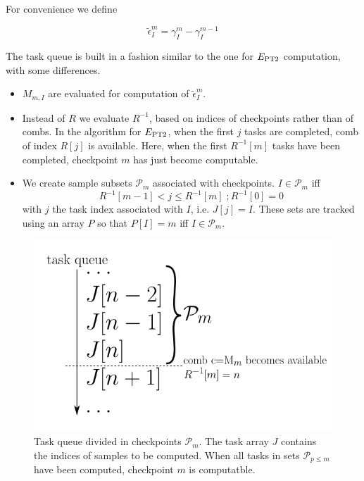 \documentclass[./thesis.tex]{subfiles}
\begin{document}
For convenience we define

\begin{equation}
\tilde \epsilon^m_I = \gamma^m_I - \gamma^{m-1}_I
\end{equation}


The task queue is built in a fashion similar to the one for $E_\text{PT2}$ computation, with some differences.
\begin{itemize}
\item
$M_{m,I}$ are evaluated for computation of $\tilde \epsilon^m_I$.
\item
Instead of $R$ we evaluate $R^{-1}$, based on indices of checkpoints rather than of combs. In the algorithm for $E_\text{PT2}$, when the first $j$ tasks are completed, comb of index $R[j]$ is available. Here, when the first $R^{-1}[m]$ tasks have been completed, checkpoint $m$ has just become computable.
\item
We create sample subsets $\mathcal{P}_m$ associated with checkpoints. $I \in \mathcal{P}_m$ iff
\begin{equation}
R^{-1}[m-1] < j \leq R^{-1}[m]  \;; R^{-1}[0] = 0
\end{equation}
with $j$ the task index associated with $I$, i.e. $J[j]=I$. These sets are tracked using an array $P$ so that $P[I]=m$ iff $I \in \mathcal{P}_m$.

\end{itemize}

\begin{figure}[h!]
	\begin{center}
		\includegraphics[width=0.45\columnwidth]{figures/matrix_dressing/taskqueue}
		\caption{Task queue divided in checkpoints $\mathcal{P}_m$. The task array $J$ contains the indices of samples to be computed. When all tasks in sets $\mathcal{P}_{p\leq m}$ have been computed, checkpoint $m$ is computatble.}
		\label{fig:task_queue}
	\end{center}
\end{figure}
\end{document}
